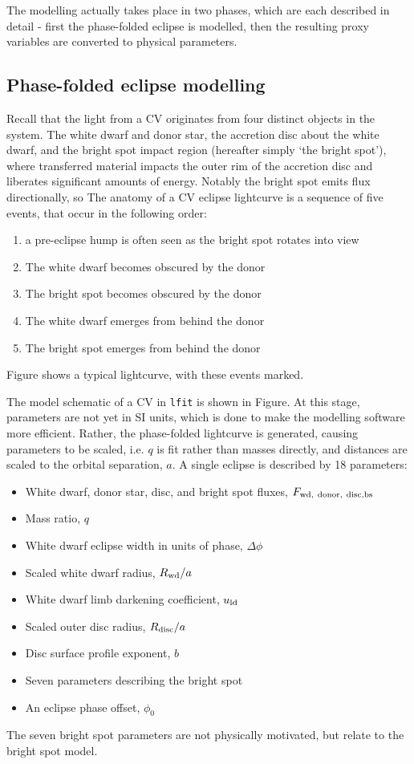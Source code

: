 The modelling actually takes place in two phases, which are each described in detail - first the phase-folded eclipse is modelled, then the resulting proxy variables are converted to physical parameters. 

\subsection{Phase-folded eclipse modelling}
\label{sect:modelling:eclipse modelling}

Recall that the light from a CV originates from four distinct objects in the system. The white dwarf and donor star, the accretion disc about the white dwarf, and the bright spot impact region (hereafter simply `the bright spot'), where transferred material impacts the outer rim of the accretion disc and liberates significant amounts of energy. Notably the bright spot emits flux directionally, so 
The anatomy of a CV eclipse lightcurve is a sequence of five events, that occur in the following order:
\begin{enumerate}
    \item a pre-eclipse hump is often seen as the bright spot rotates into view
    \item The white dwarf becomes obscured by the donor
    \item The bright spot becomes obscured by the donor
    \item The white dwarf emerges from behind the donor
    \item The bright spot emerges from behind the donor
\end{enumerate}
Figure shows a typical lightcurve, with these events marked. 

The model schematic of a CV in \lstinline{lfit} is shown in Figure. At this stage, parameters are not yet in SI units, which is done to make the modelling software more efficient. Rather, the phase-folded lightcurve is generated, causing parameters to be scaled, i.e. $q$ is fit rather than masses directly, and distances are scaled to the orbital separation, $a$.
A single eclipse is described by 18 parameters:
\begin{itemize}
    \item White dwarf, donor star, disc, and bright spot fluxes, $F_{\rm wd,\ donor,\ disc, bs}$
    \item Mass ratio, $q$
    \item White dwarf eclipse width in units of phase, $\Delta \phi$
    \item Scaled white dwarf radius, $R_{\rm wd} / a$
    \item White dwarf limb darkening coefficient, $u_{\rm ld}$
    \item Scaled outer disc radius, $R_{\rm disc}/a$
    \item Disc surface profile exponent, $b$
    \item Seven parameters describing the bright spot
    \item An eclipse phase offset, $\phi_0$
\end{itemize}
The seven bright spot parameters are not physically motivated, but relate to the bright spot model. 

